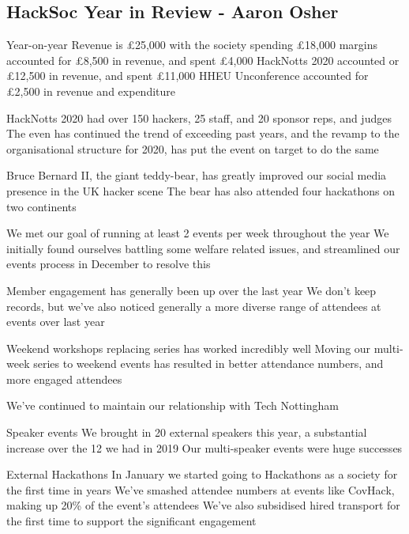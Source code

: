 \documentclass[11pt]{meetingmins}
\begin{document}
\subsection{HackSoc Year in Review - Aaron Osher}
\begin{hiddensubitems}
	\item
	Year-on-year Revenue is \pounds25,000 with the society spending \pounds18,000
		\subitem
		margins accounted for \pounds8,500 in revenue, and spent \pounds4,000
		\subitem
		HackNotts 2020 accounted or \pounds12,500 in revenue, and spent \pounds11,000
		\subitem
		HHEU Unconference accounted for \pounds2,500 in revenue and expenditure
	\item
	HackNotts 2020 had over 150 hackers, 25 staff, and 20 sponsor reps, and judges
		\subitem
		The even has continued the trend of exceeding past years, and the revamp to the organisational structure for 2020, has put the event on target to do the same
	\item
	Bruce Bernard II, the giant teddy-bear, has greatly improved our social media presence in the UK hacker scene
		\subitem The bear has also attended four hackathons on two continents
	\item
	We met our goal of running at least 2 events per week throughout the year
		\subitem
		We initially found ourselves battling some welfare related issues, and streamlined our events process in December to resolve this
	\item
	Member engagement has generally been up over the last year
		\subitem
		We don't keep records, but we've also noticed generally a more diverse range of attendees at events over last year
	\item
	Weekend workshops replacing series has worked incredibly well
		\subitem
		Moving our multi-week series to weekend events has resulted in better attendance numbers, and more engaged attendees
	\item
	We've continued to maintain our relationship with Tech Nottingham
	\item
	Speaker events
		\subitem
		We brought in 20 external speakers this year, a substantial increase over the 12 we had in 2019
		\subitem
		Our multi-speaker events were huge successes
	\item
	External Hackathons
		\subitem
		In January we started going to Hackathons as a society for the first time in years
		\subitem
		We've smashed attendee numbers at events like CovHack, making up 20\% of the event's attendees
		\subitem
		We've also subsidised hired transport for the first time to support the significant engagement
\end{hiddensubitems}
\end{document}
